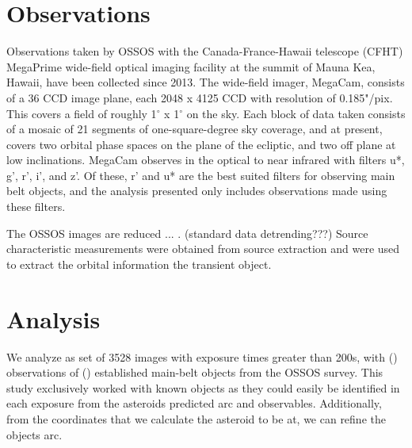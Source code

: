 \documentclass[iop,apj]{emulateapj}
\begin{document}

\section{Observations}

Observations taken by OSSOS with the Canada-France-Hawaii telescope (CFHT) MegaPrime wide-field optical imaging facility  at the summit of Mauna Kea, Hawaii, have been collected since 2013. The wide-field imager, MegaCam, consists of a 36 CCD image plane, each 2048 x 4125 CCD with resolution of 0.185"/pix. This covers a field of  roughly 1$^{\circ}$ x 1$^{\circ}$ on the sky. Each block of data taken consists of a mosaic of 21 segments of one-square-degree sky coverage, and at present, covers two orbital phase spaces on the plane of the ecliptic, and two off plane at low inclinations. MegaCam observes in the optical to near infrared with filters u*, g', r', i', and z'. Of these, r' and u* are the best suited filters for observing main belt objects, and the analysis presented only includes observations made using these filters. 

The OSSOS images are reduced ... . (standard data detrending???) Source characteristic measurements were obtained from source extraction \citep{sep} and were used to extract the orbital information the transient object. 



\section{Analysis}

We analyze as set of 3528 images with exposure times greater than 200s, with () observations of () established main-belt objects from the OSSOS survey. This study exclusively worked with known objects as they could easily be identified in each exposure from the asteroids predicted arc and observables. Additionally, from the coordinates that we calculate the asteroid to be at, we can refine the objects arc. 
\end{document}
